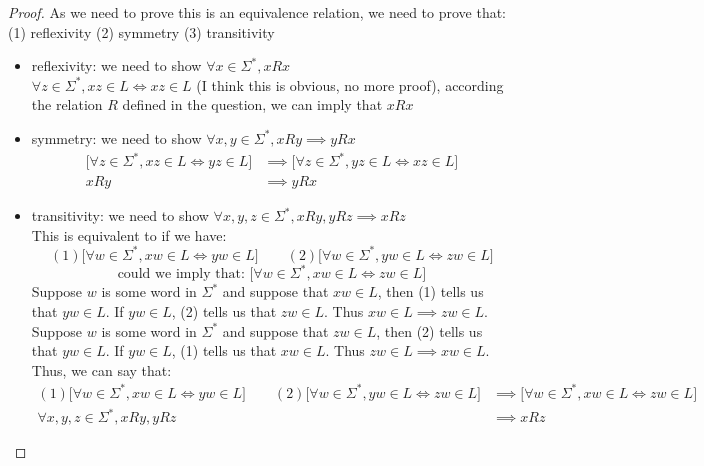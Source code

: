 \documentclass [9 pt]{article}
\theoremstyle{definition}
\begin{document}
\begin{proof}
	As we need to prove this is an equivalence relation, we need to prove that:
	(1) reflexivity (2) symmetry (3) transitivity\\
	\begin{itemize}
		\item reflexivity: we need to show   $\forall x \in \Sigma^{*}, xRx$\\
		$ \forall  z \in \Sigma^{*}, xz \in L \Leftrightarrow xz \in L $ (I think this is obvious, no more proof), according the relation $R$ defined in the question, we can imply that $xRx$
		\item symmetry: we need to show  $\forall x, y \in \Sigma^{*}, xRy \implies yRx$\\
		\begin{align*}
			\bigg[\forall z \in \Sigma^{*}, xz \in L \Leftrightarrow yz \in L\bigg] &\implies \bigg[\forall z \in \Sigma^{*}, yz \in L \Leftrightarrow xz \in L\bigg]\\
			xRy &\implies yRx
		\end{align*}
		\item transitivity: we need to show $\forall x, y, z\in \Sigma^{*}, xRy, yRz \implies xRz$\\
		This is equivalent to if we have:
			$$(1)\bigg[\forall w \in \Sigma^{*}, xw \in L \Leftrightarrow yw \in L\bigg] \quad \quad (2) \bigg[\forall w \in \Sigma^{*}, yw \in L \Leftrightarrow zw \in L\bigg] $$
			$$\text{could we imply that: } \bigg[\forall w \in \Sigma^{*}, xw \in L \Leftrightarrow zw \in L\bigg] $$
			Suppose $w$ is some word in $\Sigma^{*}$ and suppose that $xw \in L$, then (1) tells us that $yw \in L$. If $yw \in L$,  (2) tells us that $zw \in L$. Thus $xw \in L \implies zw \in L$.\\
			Suppose $w$ is some word in $\Sigma^{*}$ and suppose that $zw \in L$, then (2) tells us that $yw \in L$. If $yw \in L$,  (1) tells us that $xw \in L$. Thus $zw \in L \implies xw \in L$.\\
			Thus, we can say that: 
			\begin{align*}
					(1)\bigg[\forall w \in \Sigma^{*}, xw \in L \Leftrightarrow yw \in L\bigg] \quad \quad (2) \bigg[\forall w \in \Sigma^{*}, yw \in L \Leftrightarrow zw \in L\bigg] 
					&\implies \bigg[\forall w \in \Sigma^{*}, xw \in L \Leftrightarrow zw \in L\bigg]\\
					\forall x, y, z\in \Sigma^{*}, xRy, yRz &\implies xRz
			\end{align*}   
	\end{itemize} 
\end{proof}
\newpage
\end{document}
